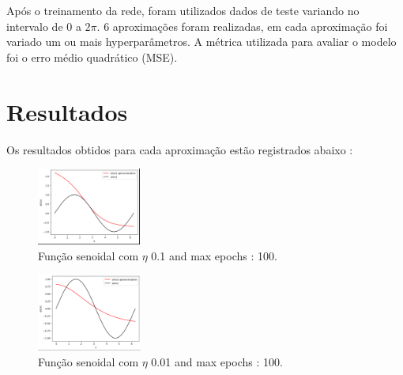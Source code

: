 \documentclass{article}
\begin{document}
Após o treinamento da rede, foram utilizados dados de teste variando no intervalo de \(0\) a \(2\pi\). 6 aproximações foram realizadas, em cada aproximação foi variado um ou mais hyperparâmetros. A métrica utilizada para avaliar o modelo foi o erro médio quadrático (MSE).

\vspace{10pt}

\section{Resultados}

\vspace{10pt}

Os resultados obtidos para cada aproximação estão registrados abaixo : 


\vspace{10pt}

\begin{figure}[h]

    \centering
    \includegraphics[height=1in]{sin_ap1.png}
    \caption{Função senoidal com $\eta$ 0.1 and max epochs : 100.}
    \label{fig:example}
    
\end{figure}

\vspace{10pt}




\vspace{10pt}

\begin{figure}[h]

    \centering
    \includegraphics[height=1in]{sin_ap2.png}
    \caption{Função senoidal com $\eta$ 0.01 and max epochs : 100.}
    \label{fig:example}
    
\end{figure}

\vspace{10pt}
\end{document}
